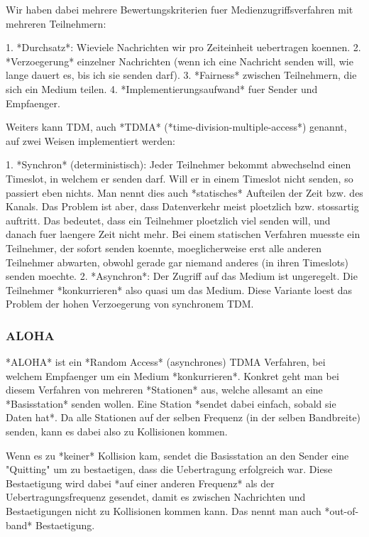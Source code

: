 Wir haben dabei mehrere Bewertungskriterien fuer Medienzugriffsverfahren mit
mehreren Teilnehmern:

1. *Durchsatz*: Wieviele Nachrichten wir pro Zeiteinheit uebertragen koennen.
2. *Verzoegerung* einzelner Nachrichten (wenn ich eine Nachricht senden will,
   wie lange dauert es, bis ich sie senden darf).
3. *Fairness* zwischen Teilnehmern, die sich ein Medium teilen.
4. *Implementierungsaufwand* fuer Sender und Empfaenger.

Weiters kann TDM, auch *TDMA* (*time-division-multiple-access*) genannt, auf zwei
Weisen implementiert werden:

1. *Synchron* (deterministisch): Jeder Teilnehmer bekommt abwechselnd einen
   Timeslot, in welchem er senden darf. Will er in einem Timeslot nicht senden,
   so passiert eben nichts.  Man nennt dies auch *statisches* Aufteilen der Zeit
   bzw. des Kanals. Das Problem ist aber, dass Datenverkehr meist ploetzlich
   bzw. stossartig auftritt. Das bedeutet, dass ein Teilnehmer ploetzlich viel
   senden will, und danach fuer laengere Zeit nicht mehr. Bei einem statischen
   Verfahren muesste ein Teilnehmer, der sofort senden koennte, moeglicherweise
   erst alle anderen Teilnehmer abwarten, obwohl gerade gar niemand anderes (in
   ihren Timeslots) senden moechte.
2. *Asynchron*: Der Zugriff auf das Medium ist ungeregelt. Die Teilnehmer
   *konkurrieren* also quasi um das Medium. Diese Variante loest das Problem der
   hohen Verzoegerung von synchronem TDM.

\subsubsection{ALOHA} 

*ALOHA* ist ein *Random Access* (asynchrones) TDMA Verfahren, bei welchem
 Empfaenger um ein Medium *konkurrieren*. Konkret geht man bei diesem Verfahren
 von mehreren *Stationen* aus, welche allesamt an eine *Basisstation* senden
 wollen. Eine Station *sendet dabei einfach, sobald sie Daten hat*. Da alle
 Stationen auf der selben Frequenz (in der selben Bandbreite) senden, kann es
 dabei also zu Kollisionen kommen.

 Wenn es zu *keiner* Kollision kam, sendet die Basisstation an den Sender eine
 "Quitting" um zu bestaetigen, dass die Uebertragung erfolgreich war. Diese
 Bestaetigung wird dabei *auf einer anderen Frequenz* als der
 Uebertragungsfrequenz gesendet, damit es zwischen Nachrichten und
 Bestaetigungen nicht zu Kollisionen kommen kann. Das nennt man auch
 *out-of-band* Bestaetigung.

